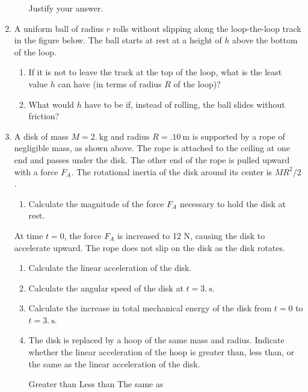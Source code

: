 \documentclass{../../../oss-apphys}
\begin{document}
\begin{enumerate}
\begin{enumerate}[resume]
    \vspace{.1in}Justify your answer.
  \end{enumerate}
  \newpage
  
\item A uniform ball of radius $r$ rolls without slipping along the
  loop-the-loop track in the figure below. The ball starts at rest at a height
  of $h$ above the bottom of the loop.
  \begin{enumerate}
  \item If it is not to leave the track at the top of the loop, what is the
    least value $h$ can have (in terms of radius $R$ of the loop)?
  \item What would $h$ have to be if, instead of rolling, the ball slides
    without friction?
  \end{enumerate}
  \newpage
  
\item A disk of mass $M =\SI{2.}{\kilo\gram}$ and radius $R=\SI{.10}{\metre}$ is
  supported by a rope of negligible mass, as shown above. The rope is attached
  to the ceiling at one end and passes under the disk. The other end of the
  rope is pulled upward with a force $F_A$. The rotational inertia of the disk
  around its center is $MR^2/2$.
  \begin{enumerate}
  \item Calculate the magnitude of the force $F_A$ necessary to hold the disk
    at rest.
  \end{enumerate}
  At time $t=0$, the force $F_A$ is increased to 12 N, causing the disk to
  accelerate upward. The rope does not slip on the disk as the disk rotates.
  \begin{enumerate}[resume]
  \item Calculate the linear acceleration of the disk.
  \item Calculate the angular speed of the disk at $t=\SI{3.}{\second}$.
  \item Calculate the increase in total mechanical energy of the disk from
    $t=0$ to $t=\SI{3.}{\second}$.
  \item The disk is replaced by a hoop of the same mass and radius. Indicate
    whether the linear acceleration of the hoop is greater than, less than, or
    the same as the linear acceleration of the disk.

    \vspace{.1in}   
    \underline{\hspace{.3in}} Greater than\hspace{.2in}
    \underline{\hspace{.3in}} Less than\hspace{.2in}
    \underline{\hspace{.3in}} The same as


\end{enumerate}
\end{enumerate}
\end{document}
